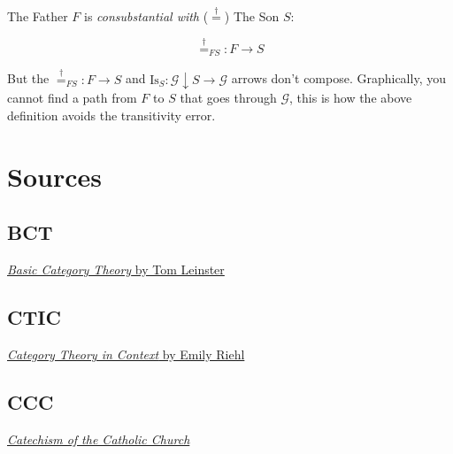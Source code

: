 \documentclass[11pt]{article}
\begin{document}
The Father $F$ is \emph{consubstantial with} ($\stackrel{\dagger}{=}$) The Son $S$:

$$\stackrel{\dagger}{=}_{FS} : F \to S$$

But the $\stackrel{\dagger}{=}_{FS} : F \to S$ and $\text{Is}_S : \mathcal{G}\downarrow S \to \mathcal{G}$ arrows don't compose. Graphically, you cannot find a path from $F$ to $S$ that goes through $\mathcal{G}$, this is how the above definition avoids the transitivity error.

\section{Sources}
\label{sec:sources}

\subsection{BCT}
\label{sec:bct}
\href{https://arxiv.org/pdf/1612.09375#page=18}{\emph{Basic Category Theory} by Tom Leinster}

\subsection{CTIC}
\label{sec:ctic}
\href{https://emilyriehl.github.io/files/context.pdf}{\emph{Category Theory in Context} by Emily Riehl}

\subsection{CCC}
\label{sec:ccc}
\href{https://www.vatican.va/archive/ENG0015/_INDEX.HTM}{\emph{Catechism of the Catholic Church}}
\end{document}

